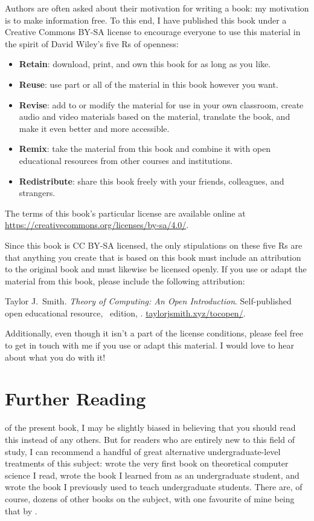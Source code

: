 Authors are often asked about their motivation for writing a book: my motivation is to make information free. To this end, I have published this book under a Creative Commons BY-SA license to encourage everyone to use this material in the spirit of David Wiley's five Rs of openness:
\begin{colouredbox}
\begin{itemize}
\item \textbf{Retain}: download, print, and own this book for as long as you like.
\item \textbf{Reuse}: use part or all of the material in this book however you want.
\item \textbf{Revise}: add to or modify the material for use in your own classroom, create audio and video materials based on the material, translate the book, and make it even better and more accessible.
\item \textbf{Remix}: take the material from this book and combine it with open educational resources from other courses and institutions.
\item \textbf{Redistribute}: share this book freely with your friends, colleagues, and strangers.
\end{itemize}
\end{colouredbox}
\noindent
The terms of this book's particular license are available online at \url{https://creativecommons.org/licenses/by-sa/4.0/}.

Since this book is CC BY-SA licensed, the only stipulations on these five Rs are that anything you create that is based on this book must include an attribution to the original book and must likewise be licensed openly. If you use or adapt the material from this book, please include the following attribution:
\begin{colouredbox}
Taylor J.\ Smith. \textit{Theory of Computing: An Open Introduction}. Self-published open educational resource, \editionnumber\ edition, \editionyear. \url{taylorjsmith.xyz/tocopen/}.
\end{colouredbox}
\noindent
Additionally, even though it isn't a part of the license conditions, please feel free to get in touch with me if you use or adapt this material. I would love to hear about what you do with it!

\section*{Further Reading}

 of the present book, I may be slightly biased in believing that you should read this instead of any others. But for readers who are entirely new to this field of study, I can recommend a handful of great alternative undergraduate-level treatments of this subject: \citet{HopcroftUllman1979IntroductionToAutomataTheory} wrote the very first book on theoretical computer science I read, \citet{Rich2008AutomataComputabilityComplexity} wrote the book I learned from as an undergraduate student, and \citet{Sipser2013TheoryOfComputation3rdEd} wrote the book I previously used to teach undergraduate students. There are, of course, dozens of other books on the subject, with one favourite of mine being that by \citet{Kozen1997AutomataAndComputability}.

